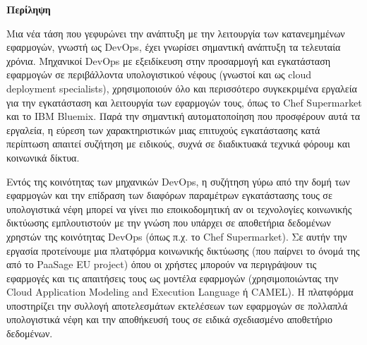 \thispagestyle{empty}
\begin{titlepage}
\begin{center}
{\bf\Large{Περίληψη}}\\
\end{center}

\indent  

Μια νέα τάση που γεφυρώνει την ανάπτυξη με την λειτουργία των κατανεμημένων εφαρμογών, γνωστή ως DevOps, έχει γνωρίσει σημαντική ανάπτυξη τα τελευταία χρόνια. Μηχανικοί DevOps με εξειδίκευση στην προσαρμογή και εγκατάσταση εφαρμογών σε περιβάλλοντα υπολογιστικού νέφους (γνωστοί και ως cloud deployment specialists), χρησιμοποιούν όλο και περισσότερο συγκεκριμένα εργαλεία για την εγκατάσταση και λειτουργία των εφαρμογών τους, όπως το Chef Supermarket και το IBM Bluemix. Παρά την σημαντική αυτοματοποίηση που προσφέρουν αυτά τα εργαλεία, η εύρεση των χαρακτηριστικών μιας επιτυχούς εγκατάστασης κατά περίπτωση απαιτεί συζήτηση με ειδικούς, συχνά σε διαδικτυακά τεχνικά φόρουμ και κοινωνικά δίκτυα.

Εντός της κοινότητας των μηχανικών DevOps, η συζήτηση γύρω από την δομή των εφαρμογών και την επίδραση των διαφόρων παραμέτρων εγκατάστασης τους σε υπολογιστικά νέφη μπορεί να γίνει πιο εποικοδομητική αν οι τεχνολογίες κοινωνικής δικτύωσης εμπλουτιστούν με την γνώση που υπάρχει σε αποθετήρια δεδομένων χρηστών της κοινότητας DevOps (όπως π.χ. το Chef Supermarket). Σε αυτήν την εργασία προτείνουμε μια πλατφόρμα κοινωνικής δικτύωσης (που παίρνει το όνομά της από το PaaSage EU project) όπου οι χρήστες μπορούν να περιγράψουν τις εφαρμογές και τις απαιτήσεις τους ως μοντέλα εφαρμογών (χρησιμοποιώντας την Cloud Application Modeling and Execution Language ή CAMEL). Η πλατφόρμα υποστηρίζει την συλλογή αποτελεσμάτων εκτελέσεων των εφαρμογών σε πολλαπλά υπολογιστικά νέφη και την αποθήκευσή τους σε ειδικά σχεδιασμένο αποθετήριο δεδομένων.


\end{titlepage}
